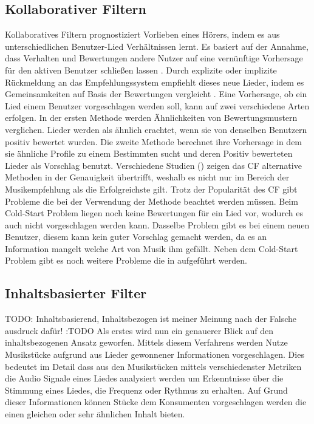 \documentclass[twosided,a4,10pt]{article}
\begin{document}
\begin{multicols}{2}
\subsection{Kollaborativer Filtern}
Kollaboratives Filtern prognostiziert Vorlieben eines Hörers, indem es aus unterschiedlichen Benutzer-Lied Verhältnissen lernt. Es basiert auf der Annahme, dass Verhalten und Bewertungen andere Nutzer auf eine vernünftige Vorhersage für den aktiven Benutzer schließen lassen \cite{celma}. Durch explizite oder implizite Rückmeldung an das Empfehlungssystem empfiehlt dieses neue Lieder, indem es Gemeinsamkeiten auf Basis der Bewertungen vergleicht \cite{mcfee}.\newline
Eine Vorhersage, ob ein Lied einem Benutzer vorgeschlagen werden soll, kann auf zwei verschiedene Arten erfolgen. In der ersten Methode werden Ähnlichkeiten von Bewertungsmustern verglichen. Lieder werden als ähnlich erachtet, wenn sie von denselben Benutzern positiv bewertet wurden. Die zweite Methode berechnet ihre Vorhersage in dem sie ähnliche Profile zu einem Bestimmten sucht und deren Positiv bewerteten Lieder als Vorschlag benutzt. \cite{ekstrandand}\newline
Verschiedene Studien (\cite{mcfee}\cite{barrington}) zeigen das CF alternative Methoden in der Genauigkeit übertrifft, weshalb es nicht nur im Bereich der Musikempfehlung als die Erfolgreichste gilt.\newline
Trotz der Popularität des CF gibt Probleme die bei der Verwendung der Methode beachtet werden müssen. Beim Cold-Start Problem liegen noch keine Bewertungen für ein Lied vor, wodurch es auch nicht vorgeschlagen werden kann. Dasselbe Problem gibt es bei einem neuen Benutzer, diesem kann kein guter Vorschlag gemacht werden, da es an Information mangelt welche Art von Musik ihm gefällt. \cite{celma} Neben dem Cold-Start Problem gibt es noch weitere Probleme die in \cite{celma} aufgeführt werden.

\subsection{Inhaltsbasierter Filter}
TODO: Inhaltsbasierend, Inhaltsbezogen ist meiner Meinung nach der Falsche ausdruck dafür! :TODO
Als erstes wird nun ein genauerer Blick auf den inhaltsbezogenen Ansatz geworfen. Mittels diesem Verfahrens werden Nutze Musikstücke aufgrund aus Lieder gewonnener Informationen vorgeschlagen. Dies bedeutet im Detail dass aus den Musikstücken mittels verschiedenster Metriken die Audio Signale eines Liedes analysiert werden um Erkenntnisse über die Stimmung eines Liedes, die Frequenz oder Rythmus zu erhalten. Auf Grund dieser Informationen können Stücke dem Konsumenten vorgeschlagen werden die einen gleichen oder sehr ähnlichen Inhalt bieten.


\end{multicols}
\end{document}
